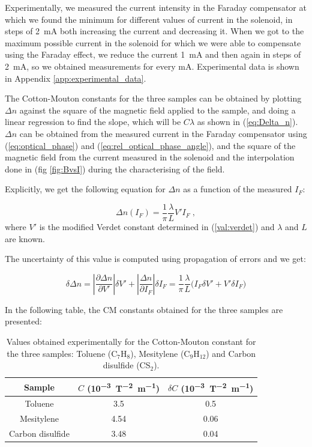 \documentclass[11pt,a4paper]{article}
\begin{document}
Experimentally, we measured the current intensity in the Faraday compensator at which we found the minimum for different values of current in the solenoid, in steps of \SI{2}{\mA} both increasing the current and decreasing it. When we got to the maximum possible current in the solenoid for which we were able to compensate using the Faraday effect, we reduce the current \SI{1}{\mA} and then again in steps of \SI{2}{\mA}, so we obtained measurements for every \si{\mA}. Experimental data is shown in Appendix \ref{app:experimental_data}.

The Cotton-Mouton constants for the three samples can be obtained by plotting $\Delta n$ against the square of the magnetic field applied to the sample, and doing a linear regression to find the slope, which will be $C\lambda$ as shown in (\ref{eq:Delta_n}). $\Delta n$ can be obtained from the measured current in the Faraday compensator using (\ref{eq:optical_phase}) and (\ref{eq:rel_optical_phase_angle}), and the square of the magnetic field from the current measured in the solenoid and the interpolation done in (fig \ref{fig:BvsI}) during the characterising of the field.

Explicitly, we get the following equation for $\Delta n$ as a function of the measured $I_F$:

\begin{equation}\label{eq:delta_n}
\Delta n(I_F)=\frac{1}{\pi}\frac{\lambda}{L}V'I_F\;,
\end{equation}
where $V'$ is the modified Verdet constant determined in (\ref{val:verdet}) and $\lambda$ and $L$ are known.

The uncertainty of this value is computed using propagation of errors and we get:

\begin{equation}\label{eq:d_delta_n}
\delta\Delta n=\left|\frac{\partial\Delta n}{\partial V'}\right|\delta V'+\left|\frac{\Delta n}{\partial I_F}\right|\delta I_F=\frac{1}{\pi}\frac{\lambda}{L}\big(I_F\delta V'+V'\delta I_F\big)
\end{equation}

In the following table, the CM constants obtained for the three samples are presented:

\begin{table}[H]
\centering
\begin{tabular}{ccc}
\toprule
Sample & $C$ (\si{10^{-3}.\tesla^{-2}.\m^{-1}}) & $\delta C$ (\si{10^{-3}.\tesla^{-2}.\m^{-1}})\\
\midrule
Toluene & 3.5 & 0.5 \\
Mesitylene & 4.54 & 0.06 \\
Carbon disulfide & 3.48 & 0.04 \\
\bottomrule
\end{tabular}
\caption{Values obtained experimentally for the Cotton-Mouton constant for the three samples: Toluene (C$_7$H$_8$), Mesitylene (C$_9$H$_{12}$) and Carbon disulfide (CS$_2$).}
\label{table:CM}
\end{table}
\end{document}
